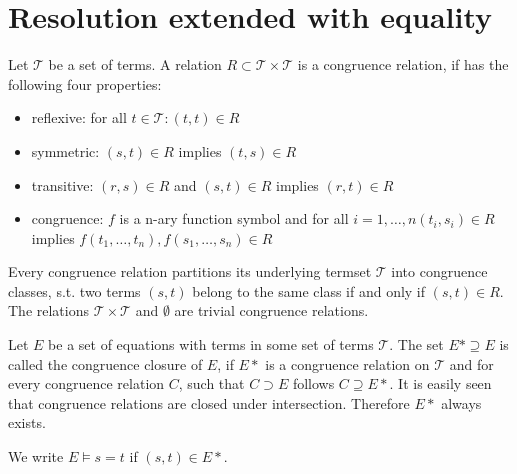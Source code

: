 \section*{Resolution extended with equality}

Let $\mathcal{T}$ be a set of terms.
A relation $R \subset \mathcal{T} \times \mathcal{T}$ is a congruence relation, if has the following four properties:
\begin{itemize}
	\item reflexive: for all $t \in \mathcal{T}: (t,t) \in R$
	\item symmetric: $(s,t) \in R$ implies $(t,s) \in R$
	\item transitive: $(r,s) \in R$ and $(s,t) \in R$ implies $(r,t) \in R$
	\item congruence: $f$ is a n-ary function symbol and for all $i = 1,\ldots,n (t_i,s_i) \in R$ implies $f(t_1,\ldots,t_n),f(s_1,\ldots,s_n) \in R$
\end{itemize}

Every congruence relation partitions its underlying termset $\mathcal{T}$ into congruence classes, s.t. two terms $(s,t)$ belong to the same class if and only if $(s,t) \in R$.
The relations $\mathcal{T} \times \mathcal{T}$ and $\emptyset$ are trivial congruence relations.

Let $E$ be a set of equations with terms in some set of terms $\mathcal{T}$.
The set $E* \supseteq E$ is called the congruence closure of $E$, 
if $E*$ is a congruence relation on $\mathcal{T}$ and for every congruence relation $C$, such that $C \supset E$ follows $C \supseteq E*$.
It is easily seen that congruence relations are closed under intersection.
Therefore $E*$ always exists.

We write $E \models s = t$ if $(s,t) \in E*$.